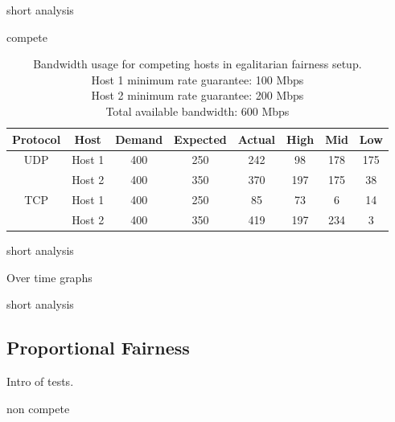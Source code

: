 \documentclass[accepted,single]{gipaper}
\begin{document}
short analysis

compete

\begin{table}[h]
	\label{egal_c}
	\vspace{-3mm}
	\begin{center}
		\begin{small}
		\setlength\tabcolsep{1.5pt}
			\begin{tabular}{cccccccc}
				Protocol & Host & Demand & Expected & Actual & High & Mid & Low\\
				\hline
				UDP & Host 1 & 400 & 250 & 242 & 98 & 178 & 175\\
				    & Host 2 & 400 & 350 & 370 & 197 & 175 & 38\\
				\hline
				TCP & Host 1 & 400 & 250 & 85 & 73 & 6 & 14\\
				    & Host 2 & 400 & 350 & 419 & 197 & 234 & 3\\
			\end{tabular}
		\end{small}
	\end{center}
	\caption{Bandwidth usage for competing hosts in egalitarian fairness setup.\\
	Host 1 minimum rate guarantee: 100 Mbps\\
	Host 2 minimum rate guarantee: 200 Mbps\\	
	Total available bandwidth: 600 Mbps}
	\vspace{-3mm}
\end{table}

short analysis

Over time graphs

short analysis

\subsection{Proportional Fairness}
\label{dba_prop}
Intro of tests.

non compete
\end{document}
